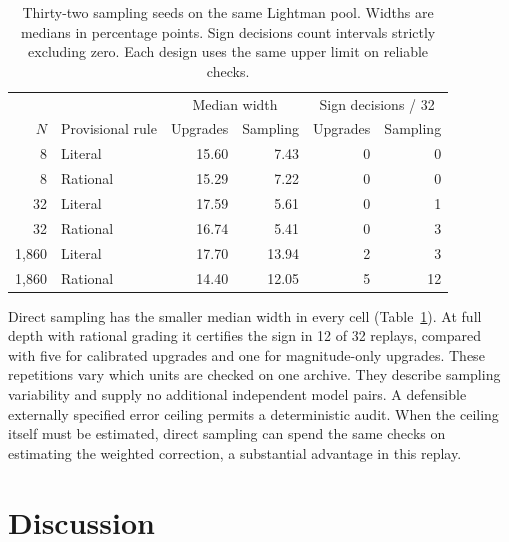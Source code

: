 \documentclass[10pt,letterpaper]{article}
\begin{document}
\begin{table}[!ht]\centering\small
\caption{Thirty-two sampling seeds on the same Lightman pool. Widths are medians in percentage points. Sign decisions count intervals strictly excluding zero. Each design uses the same upper limit on reliable checks.}\label{tab:control}
\begin{tabular}{rlrrrr}\toprule
& & \multicolumn{2}{c}{Median width} & \multicolumn{2}{c}{Sign decisions / 32}\\
$N$ & Provisional rule & Upgrades & Sampling & Upgrades & Sampling\\\midrule
8 & Literal   & 15.60 & 7.43 & 0 & 0\\
8 & Rational  & 15.29 & 7.22 & 0 & 0\\
32 & Literal  & 17.59 & 5.61 & 0 & 1\\
32 & Rational & 16.74 & 5.41 & 0 & 3\\
1,860 & Literal & 17.70 & 13.94 & 2 & 3\\
1,860 & Rational & 14.40 & 12.05 & 5 & 12\\
\bottomrule\end{tabular}
\end{table}
Direct sampling has the smaller median width in every cell (Table~\ref{tab:control}). At full depth with rational grading it certifies the sign in 12 of 32 replays, compared with five for calibrated upgrades and one for magnitude-only upgrades. These repetitions vary which units are checked on one archive. They describe sampling variability and supply no additional independent model pairs. A defensible externally specified error ceiling permits a deterministic audit. When the ceiling itself must be estimated, direct sampling can spend the same checks on estimating the weighted correction, a substantial advantage in this replay.
\section*{Discussion}
\end{document}
